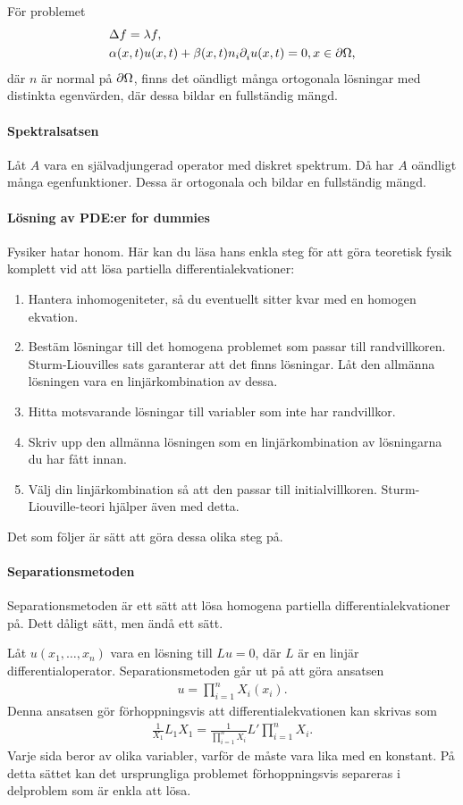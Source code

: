 För problemet
\begin{align*}
	&\Delta f = \lambda f, \\
	&\alpha(x, t)u(x, t) + \beta(x, t)n_{i}\partial_{i}^{}u(x, t) = 0, x\in\partial \Omega,
\end{align*}
där $n$ är normal på $\partial \Omega$, finns det oändligt många ortogonala lösningar med distinkta egenvärden, där dessa bildar en fullständig mängd.

\paragraph{Spektralsatsen}
Låt $A$ vara en självadjungerad operator med diskret spektrum. Då har $A$ oändligt många egenfunktioner. Dessa är ortogonala och bildar en fullständig mängd.

\paragraph{Lösning av PDE:er for dummies}

Fysiker hatar honom. Här kan du läsa hans enkla steg för att göra teoretisk fysik komplett vid att lösa partiella differentialekvationer:
\begin{enumerate}
	\item Hantera inhomogeniteter, så du eventuellt sitter kvar med en homogen ekvation.
	\item Bestäm lösningar till det homogena problemet som passar till randvillkoren. Sturm-Liouvilles sats garanterar att det finns lösningar. Låt den allmänna lösningen vara en linjärkombination av dessa.
	\item Hitta motsvarande lösningar till variabler som inte har randvillkor.
	\item Skriv upp den allmänna lösningen som en linjärkombination av lösningarna du har fått innan.
	\item Välj din linjärkombination så att den passar till initialvillkoren. Sturm-Liouville-teori hjälper även med detta.
\end{enumerate}
Det som följer är sätt att göra dessa olika steg på.

\paragraph{Separationsmetoden}
Separationsmetoden är ett sätt att lösa homogena partiella differentialekvationer på. Dett dåligt sätt, men ändå ett sätt.

Låt $u(x_{1}, \dots, x_{n})$ vara en lösning till $Lu = 0$, där $L$ är en linjär differentialoperator. Separationsmetoden går ut på att göra ansatsen
\begin{align*}
	u = \prod\limits_{i = 1}^{n}X_{i}(x_{i}).
\end{align*}
Denna ansatsen gör förhoppningsvis att differentialekvationen kan skrivas som
\begin{align*}
	\frac{1}{X_{1}}L_{1}X_{1} = \frac{1}{\prod\limits_{i = 1}^{n}X_{i}}L'\prod\limits_{i = 1}^{n}X_{i}.
\end{align*}
Varje sida beror av olika variabler, varför de måste vara lika med en konstant. På detta sättet kan det ursprungliga problemet förhoppningsvis separeras i delproblem som är enkla att lösa.

